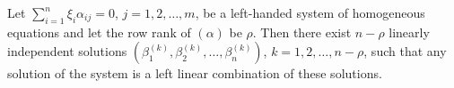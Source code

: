 Let $\sum_{i=1}^{n} \xi_i \alpha_{ij} = 0$, $j = 1, 2, \dots, m$, be a left-handed system of homogeneous equations and let the row rank of $(\alpha)$ be $\rho$. Then there exist $n - \rho$ linearly independent solutions $(\beta_1^{(k)}, \beta_2^{(k)}, \dots, \beta_n^{(k)})$, $k = 1, 2, \dots, n - \rho$, such that any solution of the system is a left linear combination of these solutions.
